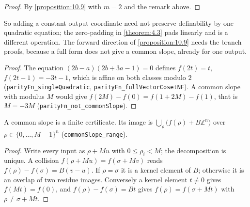 \begin{proof}
By \cref{proposition:10.9} with $m = 2$ and the remark above.
\end{proof}

So adding a constant output coordinate need not preserve definability by one quadratic equation; the zero-padding in \cref{theorem:4.3} pads linearly and is a different operation. The forward direction of \cref{proposition:10.9} needs the branch proofs, because a full form does not give a common slope, already for one output.


\begin{proof}
The equation $(2b - a)(2b + 3a - 1) = 0$ defines $f(2t) = t$, $f(2t + 1) = -3t - 1$, which is affine on both classes modulo $2$ (\texttt{parityFn\_singleQuadratic}, \texttt{parityFn\_fullVectorCosetNF}). A common slope with modulus $M$ would give $f(2M) - f(0) = f(1 + 2M) - f(1)$, that is $M = -3M$ (\texttt{parityFn\_not\_commonSlope}).
\end{proof}

A common slope is a finite certificate. Its image is $\bigcup_{ρ}\big(f(ρ) + Bℤ^{n}\big)$ over $ρ ∈ \{0, \dots, M - 1\}^{n}$ (\texttt{commonSlope\_range}).


\begin{proof}
Write every input as $ρ + Mu$ with $0 ≤ ρ_{i} < M$; the decomposition is unique. A collision $f(ρ + Mu) = f(σ + Mv)$ reads $f(ρ) - f(σ) = B(v - u)$. If $ρ = σ$ it is a kernel element of $B$; otherwise it is an overlap of two residue images. Conversely a kernel element $t ≠ 0$ gives $f(Mt) = f(0)$, and $f(ρ) - f(σ) = Bt$ gives $f(ρ) = f(σ + Mt)$ with $ρ ≠ σ + Mt$.
\end{proof}

